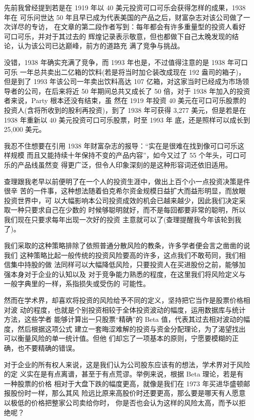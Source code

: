 \documentclass[UTF8,a4paper,zihao=-4,fontset = windows]{ctexart} %
\begin{document}
先前我曾经提到若是在 1919 年以 40 美元投资可口可乐会获得怎样的成果，1938 年在
可乐问世达 50 年且早已成为代表美国的产品之后，财富杂志对该公司做了一次详尽的专访，
在文章的第二段作者写到：每年都会有许多重量型的投资人看好可口可乐，并对于其过去的
辉煌记录表示敬意，但也都做下自己太晚发现的结论，认为该公司已达巅峰，前方的道路充
满了竞争与挑战。

没错，1938 年确实充满了竞争，而 1993 年也是，不过值得注意的是 1938 年可口可乐
一年总共卖出二亿箱的饮料(若是将当时加仑装改成现在 192 盎司的箱子)，但是到了 1993
年该公司一年卖出饮料高达 107 亿箱，对这家当时已经成为市场领导者的公司，在后来将近
50 年期间总共又成长了 50 倍，对于 1938 年加入的投资者来说，Party 根本还没有结束，虽
然在 1919 年投资 40 美元在可口可乐股票的投资人(含将所收到的股利再投资)，到了 1938
年可获得 3,277 美元，但是若是在 1938 年重新以 40 美元投资可口可乐股票，时至 1993 年
底，还是照样可以成长到 25,000 美元。

我忍不住想要在引用 1938 年财富杂志的报导：“实在是很难在找到像可口可乐这样规模
而且又能持续十年保持不变的产品内容”，如今又过了 55 个年头，可口可乐的产品线虽然变
得更广泛，但令人印象深刻的是这种形容词还依旧适用。

查理跟我老早以前便明了在一个人的投资生涯中，做出上百个小一点投资决策是件很辛
苦的一件事，这种想法随着伯克希尔资金规模日益扩大而益形明显，而放眼投资世界中，可
以大幅影响本公司投资成效的机会已越来越少，因此我们决定采取一种只要求自己在少数的
时候够聪明就好，而不是每回都要非常的聪明，所以我们现在只要求每年出现一次好的投资
主意就可以了(查理提醒我今年该轮到我了)。

我们采取的这种策略排除了依照普通分散风险的教条，许多学者便会言之凿凿的说我们
这种策略比起一般传统的投资风险要高的许多，这点我们不敢苟同，我们相信集中持股的做
法同样可以大幅降低风险，只要投资人在买进股份之前，能够加强本身对于企业的认知以及
对于竞争能力熟悉的程度，在这里我们将风险定义与一般字典里的一样，系指损失或受伤的
可能性。

然而在学术界，却喜欢将投资的风险给予不同的定义，坚持把它当作是股票价格相对波
动的程度，也就是个别投资相较于全体投资波动的幅度，运用数据库与统计方法，这些学者
能够计算出一只股票“精确”的 Beta 值，代表其过去相对波动的幅度，然后根据这项公式
建立一套晦涩难解的投资与资金分配理论，为了渴望找出可以衡量风险的单一统计值。但他
们却忘了一项基本的原则，宁愿要模糊的正确，也不要精确的错误。

对于企业的所有权人来说，这是我们认为公司股东应该有的想法，学术界对于风险的定
义实在是有点离谱，甚至于有点荒谬。举例来说，根据 Beta 理论，若是有一种股票的价格
相对于大盘下跌的幅度更高，就像是我们在 1973 年买进华盛顿邮报股份时一样，那么其风
险远比原来高股价时还要更高，那么要是哪天有人愿意以极低的价格把整家公司卖给你时，
你是否也会认为这样的风险太高，而予以拒绝呢？
\end{document}
